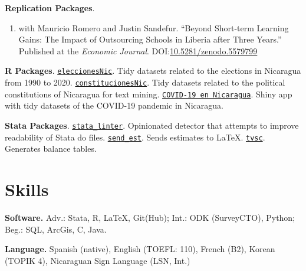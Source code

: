 \documentclass[a4paper, 10pt]{article}
\renewenvironment{itemize}{
  \begin{list}{}
    { \setlength{\itemsep}{5pt}
      \setlength{\parsep}{0pt}
      \setlength{\topsep}{0pt}
      \setlength{\leftmargin}{0em} } }{
  \end{list}}
\begin{document}
\begin{itemize}
  \item \textbf{Replication Packages}.
  \begin{enumerate}[leftmargin=10pt, label={}, itemindent=-10pt, nosep]
    \item with Mauricio Romero and Justin Sandefur. ``Beyond Short-term Learning Gains: The Impact of Outsourcing Schools in Liberia after Three Years.'' Published at the \textit{Economic Journal}. DOI:\href{https://doi.org/10.5281/zenodo.5579799}{10.5281/zenodo.5579799}
  \end{enumerate}
  \item \textbf{R Packages}. \newline \texttt{\href{https://github.com/RRMaximiliano/eleccionesNic}{eleccionesNic}}. Tidy datasets related to the elections in Nicaragua from 1990 to 2020. \newline \texttt{\href{https://github.com/RRMaximiliano/constitucionesNic}{constitucionesNic}}. Tidy datasets related to the political constitutions of Nicaragua for text mining. \newline \texttt{\href{https://rrmaximiliano.shinyapps.io/covid-nicaragua/}{COVID-19 en Nicaragua}}. Shiny app with tidy datasets of the COVID-19 pandemic in Nicaragua.
  \item \textbf{Stata Packages}. \newline \texttt{\href{https://github.com/worldbank/stata-linter}{stata\_linter}}. Opinionated detector that attempts to improve readability of Stata do files. \newline \texttt{\href{https://github.com/RRMaximiliano/send\_est}{send\_est}}. Sends estimates to \LaTeX. \newline \texttt{\href{https://github.com/RRMaximiliano/tvsc}{tvsc}}. Generates balance tables.
\end{itemize}


\section*{Skills}
\begin{itemize}
\item \textbf{Software.} \newline Adv.: Stata, R, \LaTeX, Git(Hub); Int.: ODK (SurveyCTO), Python; Beg.: SQL, ArcGis, C, Java.
\item \textbf{Language.} \newline Spanish (native), English (TOEFL: 110), French (B2), Korean (TOPIK 4), Nicaraguan Sign Language (LSN, Int.)
\end{itemize}
\bigskip
\end{document}
